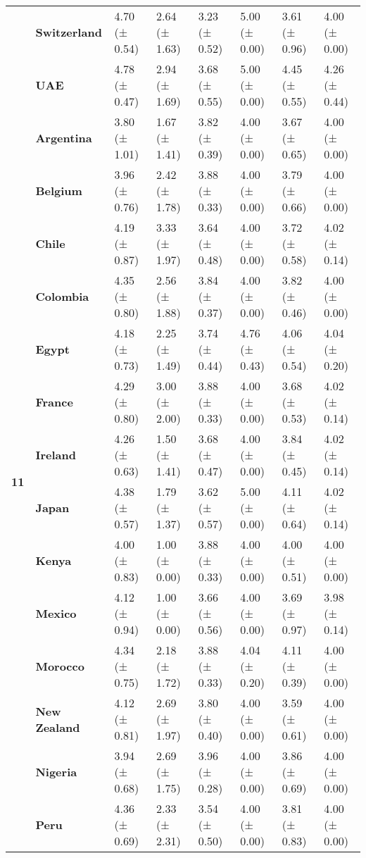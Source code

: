 \begin{longtable}{llllllll}
\textbf{} & \textbf{Switzerland} & 4.70 (± 0.54) & 2.64 (± 1.63) & 3.23 (± 0.52) & 5.00 (± 0.00) & 3.61 (± 0.96) & 4.00 (± 0.00) \\
\textbf{} & \textbf{UAE} & 4.78 (± 0.47) & 2.94 (± 1.69) & 3.68 (± 0.55) & 5.00 (± 0.00) & 4.45 (± 0.55) & 4.26 (± 0.44) \\
\cline{1-8}
\multirow[t]{19}{*}{\textbf{11}} & \textbf{Argentina} & 3.80 (± 1.01) & 1.67 (± 1.41) & 3.82 (± 0.39) & 4.00 (± 0.00) & 3.67 (± 0.65) & 4.00 (± 0.00) \\
\textbf{} & \textbf{Belgium} & 3.96 (± 0.76) & 2.42 (± 1.78) & 3.88 (± 0.33) & 4.00 (± 0.00) & 3.79 (± 0.66) & 4.00 (± 0.00) \\
\textbf{} & \textbf{Chile} & 4.19 (± 0.87) & 3.33 (± 1.97) & 3.64 (± 0.48) & 4.00 (± 0.00) & 3.72 (± 0.58) & 4.02 (± 0.14) \\
\textbf{} & \textbf{Colombia} & 4.35 (± 0.80) & 2.56 (± 1.88) & 3.84 (± 0.37) & 4.00 (± 0.00) & 3.82 (± 0.46) & 4.00 (± 0.00) \\
\textbf{} & \textbf{Egypt} & 4.18 (± 0.73) & 2.25 (± 1.49) & 3.74 (± 0.44) & 4.76 (± 0.43) & 4.06 (± 0.54) & 4.04 (± 0.20) \\
\textbf{} & \textbf{France} & 4.29 (± 0.80) & 3.00 (± 2.00) & 3.88 (± 0.33) & 4.00 (± 0.00) & 3.68 (± 0.53) & 4.02 (± 0.14) \\
\textbf{} & \textbf{Ireland} & 4.26 (± 0.63) & 1.50 (± 1.41) & 3.68 (± 0.47) & 4.00 (± 0.00) & 3.84 (± 0.45) & 4.02 (± 0.14) \\
\textbf{} & \textbf{Japan} & 4.38 (± 0.57) & 1.79 (± 1.37) & 3.62 (± 0.57) & 5.00 (± 0.00) & 4.11 (± 0.64) & 4.02 (± 0.14) \\
\textbf{} & \textbf{Kenya} & 4.00 (± 0.83) & 1.00 (± 0.00) & 3.88 (± 0.33) & 4.00 (± 0.00) & 4.00 (± 0.51) & 4.00 (± 0.00) \\
\textbf{} & \textbf{Mexico} & 4.12 (± 0.94) & 1.00 (± 0.00) & 3.66 (± 0.56) & 4.00 (± 0.00) & 3.69 (± 0.97) & 3.98 (± 0.14) \\
\textbf{} & \textbf{Morocco} & 4.34 (± 0.75) & 2.18 (± 1.72) & 3.88 (± 0.33) & 4.04 (± 0.20) & 4.11 (± 0.39) & 4.00 (± 0.00) \\
\textbf{} & \textbf{New Zealand} & 4.12 (± 0.81) & 2.69 (± 1.97) & 3.80 (± 0.40) & 4.00 (± 0.00) & 3.59 (± 0.61) & 4.00 (± 0.00) \\
\textbf{} & \textbf{Nigeria} & 3.94 (± 0.68) & 2.69 (± 1.75) & 3.96 (± 0.28) & 4.00 (± 0.00) & 3.86 (± 0.69) & 4.00 (± 0.00) \\
\textbf{} & \textbf{Peru} & 4.36 (± 0.69) & 2.33 (± 2.31) & 3.54 (± 0.50) & 4.00 (± 0.00) & 3.81 (± 0.83) & 4.00 (± 0.00) \\

\end{longtable}
